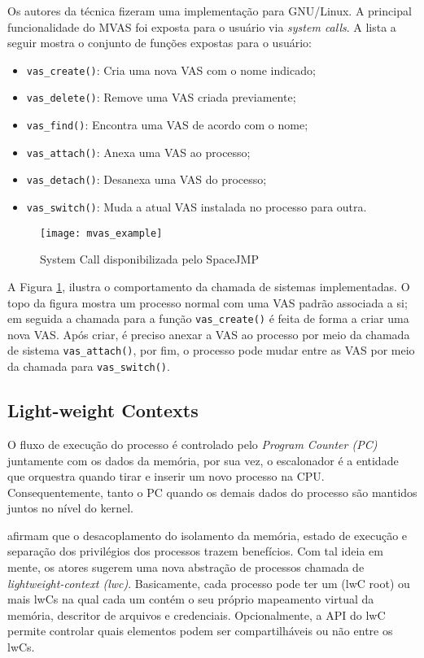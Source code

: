 Os autores da técnica fizeram uma implementação para GNU/Linux. A principal
funcionalidade do MVAS foi exposta para o usuário via \emph{system calls}. A
lista a seguir mostra o conjunto de funções expostas para o usuário:

\begin{itemize}
  \item \texttt{vas\_create()}: Cria uma nova VAS com o nome indicado;
  \item \texttt{vas\_delete()}: Remove uma VAS criada previamente;
  \item \texttt{vas\_find()}: Encontra uma VAS de acordo com o nome;
  \item \texttt{vas\_attach()}: Anexa uma VAS ao processo;
  \item \texttt{vas\_detach()}: Desanexa uma VAS do processo;
  \item \texttt{vas\_switch()}: Muda a atual VAS instalada no processo para outra.
\end{itemize}

\begin{figure}[!h]
  \centering
  \texttt{[image: mvas\_example]} 
  \caption{System Call disponibilizada pelo SpaceJMP \cite{ellarge}}
  \label{fig:mvas_example}
\end{figure}

A Figura \ref{fig:mvas_example}, ilustra o comportamento da chamada de sistemas
implementadas. O topo da figura mostra um processo normal com uma VAS padrão
associada a si; em seguida a chamada para a função \texttt{vas\_create()} é
feita de forma a criar uma nova VAS. Após criar, é preciso anexar a VAS ao
processo por meio da chamada de sistema \texttt{vas\_attach()}, por fim, o
processo pode mudar entre as VAS por meio da chamada para
\texttt{vas\_switch()}.

\subsection{Light-weight Contexts}

O fluxo de execução do processo é controlado pelo \textit{Program Counter (PC)}
juntamente com os dados da memória, por sua vez, o escalonador é a entidade que
orquestra quando tirar e inserir um novo processo na CPU. Consequentemente,
tanto o PC quando os demais dados do processo são mantidos juntos no nível do
kernel.

\cite{litton} afirmam que o desacoplamento do isolamento da memória, estado de
execução e separação dos privilégios dos processos trazem benefícios. Com tal
ideia em mente, os atores sugerem uma nova abstração de processos chamada de
\textit{lightweight-context (lwc)}. Basicamente, cada processo pode ter um
(lwC root) ou mais lwCs na qual cada um contém o seu próprio mapeamento
virtual da memória, descritor de arquivos e credenciais. Opcionalmente, a API
do lwC permite controlar quais elementos podem ser compartilháveis ou não entre
os lwCs.


